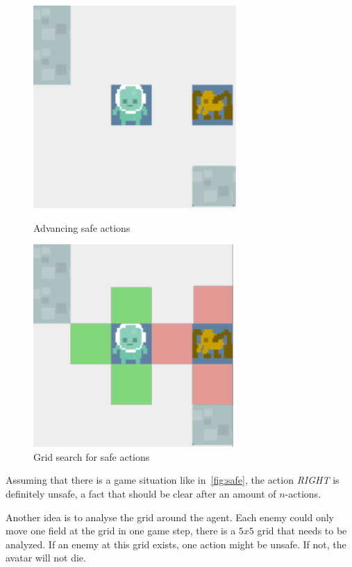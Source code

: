 \begin{figure}
\centering
\begin{minipage}{.5\textwidth}
  \centering
\includegraphics[scale=0.8]{images/safe.pdf}
\caption{Advancing safe actions}
\label{fig:safe}
\end{minipage}%
\begin{minipage}{.5\textwidth}
\centering
\includegraphics[scale=0.8]{images/safe_grid.pdf}
\caption{Grid search for safe actions}
\label{fig:safe_grid}
\end{minipage}
\end{figure}



Assuming that there is a game situation like in~\cref{fig:safe}, the action \textit{RIGHT} is definitely unsafe, a fact that should be clear after an amount of $n$-actions.

Another idea is to analyse the grid around the agent. Each enemy could only move one field at the grid
in one game step, there is a $5x5$ grid that needs to be analyzed. If an enemy at this grid exists, one action might be unsafe. If not, the avatar will not die.


